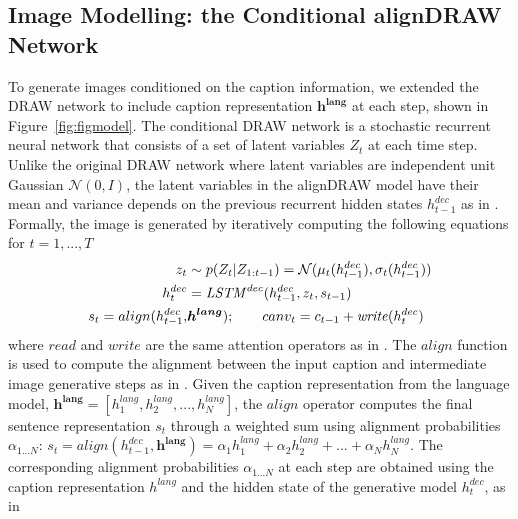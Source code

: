 \documentclass{article} %
\newcommand{\comm}[1]{}
\newcommand{\hlang}{h^{lang}}
\newcommand{\hlangall}{\boldsymbol{h^{lang}}}
\newcommand{\hdec}{h^{dec}}
\newcommand{\readop}{\mathit{read}}
\newcommand{\writeop}{\mathit{write}}
\newcommand{\decoder}{\mathit{LSTM}^{dec}}
\newcommand{\canv}{c}
\newcommand{\lat}{z}
\newcommand{\Lat}{Z}
\newcommand{\prior}{p}
\begin{document}
\subsection{Image Modelling: the Conditional alignDRAW Network}
\comm{
The DRAW network \cite{gregor_draw} is a sequential probabilistic model generating images by accumulating the output at each iterative step. While the original DRAW network assumes the latent variables are independent, it has shown in \citep{bachman_sdm} the model performance is improved by including the dependencies of latent variables. 
}
To generate images conditioned on the caption information, we extended the DRAW network \citep{gregor_draw} to include caption representation $\hlangall$ at each step, shown in Figure~\ref{fig:figmodel}. The conditional DRAW network is a stochastic recurrent neural network that consists of a set of latent variables $\Lat_t$ at each time step. Unlike the original DRAW network where latent variables are independent unit Gaussian $\mathcal{N}(0, I)$, the latent variables in the alignDRAW model have their mean and variance depends on the previous recurrent hidden states $\hdec_{t-1}$ as in \cite{bachman_sdm}. Formally, the image is generated by iteratively computing the following equations for $t=1,...,T$
\begin{align}
\vspace{-0.1in}
\label{eq:x_hat}
\lat_t &\sim \prior(\Lat_t|\Lat_{1:t-1}) = \mathcal{N}(\mu_{t}(\hdec_{t-1}), \sigma_{t}(\hdec_{t-1}))\\
\hdec_t &= \decoder(\hdec_{t-1}, z_t, s_{t-1})\\
s_{t} = align(\hdec_{t-1}, & \hlangall); \quad \quad
canv_t = \canv_{t-1} + \writeop(\hdec_t)
\label{eq:write}
\end{align}
where $\readop$ and $\writeop$ are the same attention operators as in \citep{gregor_draw}.
The $align$ function is used to compute the alignment between the input caption and intermediate image generative steps as in \cite{bahdanau_mt}. Given the caption representation from the language model, $\hlangall = [\hlang_{1}, \hlang_{2}, ..., \hlang_{N}]$, the $align$ operator computes the final sentence representation $s_t$ through a weighted sum using alignment probabilities $\alpha_{1...N}$:
$s_t=align(\hdec_{t-1}, \hlangall) = \alpha_{1}\hlang_{1} + \alpha_{2}\hlang_{2} + ... + \alpha_{N}\hlang_{N}.$
The corresponding alignment probabilities $\alpha_{1...N}$ at each step are obtained using the caption representation $\hlang$ and the hidden state of the generative model $\hdec_{t}$, as in \citep{bahdanau_mt}
\comm{
\begin{align}
e_{tj} &= v^{T}tanh(U\hlang_{j} + W\hdec_{t} + b)\\
\alpha_{j} &= \frac{exp(e_{tj})}{\sum_{j=1}^{N}exp(e_{tj})}.
\end{align}
}
\comm{
Here $\hlang_{0}$ is initialized to the learned bias.
Setting $\alpha_{1...N}$ to $\frac{1}{N}$ turns the encoder into the vanilla model introduced in \citep{cho_mt} without the attention. 
}
\end{document}
